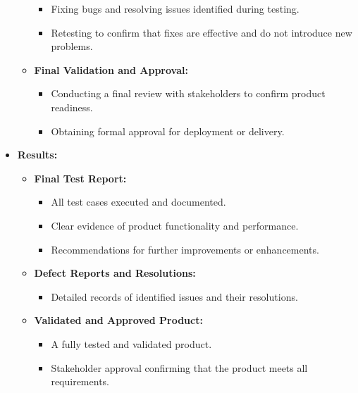 \documentclass{article}
\begin{document}
\begin{itemize}[leftmargin=*, label={}]
\begin{itemize}
                \begin{itemize}
                    \item Fixing bugs and resolving issues identified during testing.
                    \item Retesting to confirm that fixes are effective and do not introduce new problems.
                \end{itemize}
            \item \textbf{Final Validation and Approval:}
                \begin{itemize}
                    \item Conducting a final review with stakeholders to confirm product readiness.
                    \item Obtaining formal approval for deployment or delivery.
                \end{itemize}
        \end{itemize}

    \item \textbf{Results:}
        \begin{itemize}
            \item \textbf{Final Test Report:}
                \begin{itemize}
                    \item All test cases executed and documented.
                    \item Clear evidence of product functionality and performance.
                    \item Recommendations for further improvements or enhancements.
                \end{itemize}
            \item \textbf{Defect Reports and Resolutions:}
                \begin{itemize}
                    \item Detailed records of identified issues and their resolutions.
                \end{itemize}
            \item \textbf{Validated and Approved Product:}
                \begin{itemize}
                    \item A fully tested and validated product.
                    \item Stakeholder approval confirming that the product meets all requirements.
                \end{itemize}
        \end{itemize}
\end{itemize}
\end{document}
